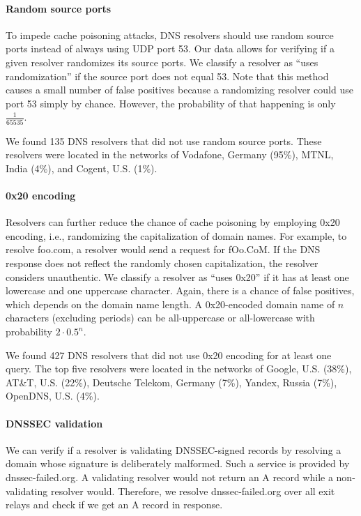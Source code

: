 \paragraph{Random source ports}
To impede cache poisoning attacks, DNS resolvers should use random source ports
instead of always using UDP port 53.  Our data allows for verifying if a given
resolver randomizes its source ports.  We classify a resolver as ``uses
randomization'' if the source port does not equal 53.  Note that this method
causes a small number of false positives because a randomizing resolver could
use port 53 simply by chance.  However, the probability of that happening is
only $\frac{1}{65535}$.

We found 135 DNS resolvers that did not use random source ports.  These
resolvers were located in the networks of Vodafone, Germany (95\%), MTNL, India
(4\%), and Cogent, U.S. (1\%).

\paragraph{0x20 encoding}
Resolvers can further reduce the chance of cache poisoning by employing 0x20
encoding, i.e., randomizing the capitalization of domain names.  For example, to
resolve foo.com, a resolver would send a request for fOo.CoM.  If the DNS
response does not reflect the randomly chosen capitalization, the resolver
considers unauthentic.  We classify a resolver as ``uses 0x20'' if it has at
least one lowercase and one uppercase character.  Again, there is a chance of
false positives, which depends on the domain name length.  A 0x20-encoded domain
name of $n$ characters (excluding periods) can be all-uppercase or all-lowercase
with probability $2 \cdot 0.5^n$.

We found 427 DNS resolvers that did not use 0x20 encoding for at least one
query.  The top five resolvers were located in the networks of Google, U.S.
(38\%), AT\&T, U.S. (22\%), Deutsche Telekom, Germany (7\%), Yandex, Russia
(7\%), OpenDNS, U.S. (4\%).

\paragraph{DNSSEC validation}
We can verify if a resolver is validating DNSSEC-signed records by resolving a
domain whose signature is deliberately malformed.  Such a service is provided by
dnssec-failed.org.  A validating resolver would not return an A record while a
non-validating resolver would.  Therefore, we resolve dnssec-failed.org over all
exit relays and check if we get an A record in response.

